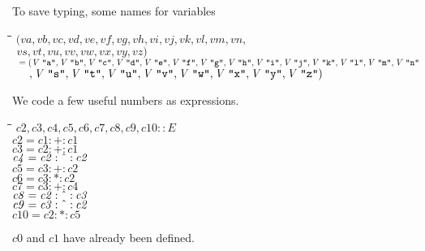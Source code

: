 \documentclass{article}
\newlength{\lwidth}\setlength{\lwidth}{4.5cm}
\newlength{\cwidth}\setlength{\cwidth}{8mm} %
\newcommand{\Conid}[1]{\mathit{#1}}
\newcommand{\Varid}[1]{\mathit{#1}}
\begin{document}
To save typing, some names for variables
\begin{tabbing}
\qquad\=\hspace{\lwidth}\=\hspace{\cwidth}\=\+\kill
${(\Varid{va},\Varid{vb},\Varid{vc},\Varid{vd},\Varid{ve},\Varid{vf},\Varid{vg},\Varid{vh},\Varid{vi},\Varid{vj},\Varid{vk},\Varid{vl},\Varid{vm},\Varid{vn},}$\\
${\phantom{(\mbox{}}\Varid{vs},\Varid{vt},\Varid{vu},\Varid{vv},\Varid{vw},\Varid{vx},\Varid{vy},\Varid{vz})}$\\
${\phantom{(\mbox{}}\mathrel{=}(\Conid{V}\;\text{\ttfamily \char34 a\char34},\Conid{V}\;\text{\ttfamily \char34 b\char34},\Conid{V}\;\text{\ttfamily \char34 c\char34},\Conid{V}\;\text{\ttfamily \char34 d\char34},\Conid{V}\;\text{\ttfamily \char34 e\char34},\Conid{V}\;\text{\ttfamily \char34 f\char34},\Conid{V}\;\text{\ttfamily \char34 g\char34},\Conid{V}\;\text{\ttfamily \char34 h\char34},\Conid{V}\;\text{\ttfamily \char34 i\char34},\Conid{V}\;\text{\ttfamily \char34 j\char34},\Conid{V}\;\text{\ttfamily \char34 k\char34},\Conid{V}\;\text{\ttfamily \char34 l\char34},\Conid{V}\;\text{\ttfamily \char34 m\char34},\Conid{V}\;\text{\ttfamily \char34 n\char34}}$\\
${\phantom{(\mbox{}}\phantom{\mathrel{=}\mbox{}},\Conid{V}\;\text{\ttfamily \char34 s\char34},\Conid{V}\;\text{\ttfamily \char34 t\char34},\Conid{V}\;\text{\ttfamily \char34 u\char34},\Conid{V}\;\text{\ttfamily \char34 v\char34},\Conid{V}\;\text{\ttfamily \char34 w\char34},\Conid{V}\;\text{\ttfamily \char34 x\char34},\Conid{V}\;\text{\ttfamily \char34 y\char34},\Conid{V}\;\text{\ttfamily \char34 z\char34})}$
\end{tabbing}
We code a few useful numbers as expressions.
\begin{tabbing}
\qquad\=\hspace{\lwidth}\=\hspace{\cwidth}\=\+\kill
${\Varid{c2},\Varid{c3},\Varid{c4},\Varid{c5},\Varid{c6},\Varid{c7},\Varid{c8},\Varid{c9},\Varid{c10}\mathbin{::}\Conid{E}}$\\
${\Varid{c2}\mathrel{=}\Varid{c1}\mathbin{:+:}\Varid{c1}}$\\
${\Varid{c3}\mathrel{=}\Varid{c2}\mathbin{:+:}\Varid{c1}}$\\
${\Varid{c4}\mathrel{=}\Varid{c2}\mathbin{:\char94 :}\Varid{c2}}$\\
${\Varid{c5}\mathrel{=}\Varid{c3}\mathbin{:+:}\Varid{c2}}$\\
${\Varid{c6}\mathrel{=}\Varid{c3}\mathbin{:*:}\Varid{c2}}$\\
${\Varid{c7}\mathrel{=}\Varid{c3}\mathbin{:+:}\Varid{c4}}$\\
${\Varid{c8}\mathrel{=}\Varid{c2}\mathbin{:\char94 :}\Varid{c3}}$\\
${\Varid{c9}\mathrel{=}\Varid{c3}\mathbin{:\char94 :}\Varid{c2}}$\\
${\Varid{c10}\mathrel{=}\Varid{c2}\mathbin{:*:}\Varid{c5}}$
\end{tabbing}\ensuremath{\Varid{c0}} and \ensuremath{\Varid{c1}} have already been defined.
\end{document}
